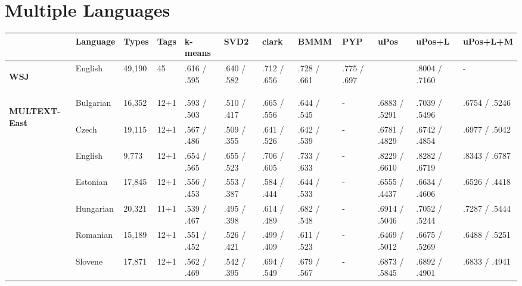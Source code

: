 \section{Multiple Languages}
\begin{landscape}
\begin{table}[ht]
  \begin{tabular}{|l|l|l|l|p{1.5cm}|p{1.5cm}|p{1.5cm}|p{1.5cm}|p{1.5cm}|p{2cm}|p{2cm}|p{2cm}|}
        \hline
        & Language   & Types   & Tags & k-means      & SVD2         & clark        & BMMM         & PYP    & uPos           & uPos+L            & uPos+L+M     \\ \hline %
        \multirow{1}{*}{\begin{sideways}\textbf{WSJ}\end{sideways}} 
        & English    & 49,190  & 45   & .616 / .595   & .640 / .582   & .712 / .656   & .728 / .661   & .775 / .697 &               & .8004 / .7160 & -           \\
        & & & & & & & & & & &\\ \hline
        \multirow{8}{*}{\begin{sideways}\textbf{MULTEXT-East}\end{sideways}} & 
        Bulgarian    & 16,352  & 12+1 & .593 / .503   & .510 / .417   & .665 / .556   & .644 / .545   & -          & .6883 / .5291  & .7039 / .5496     & .6754 / .5246 \\
        & Czech      & 19,115  & 12+1 & .567 / .486   & .509 / .355   & .641 / .526   & .642 / .539   & -          & .6781 / .4829  & .6742 / .4854     & .6977 / .5042 \\
        & English    & 9,773   & 12+1 & .654 / .565   & .655 / .523   & .706 / .605   & .733 / .633   & -          & .8229 / .6610  & .8282 / .6719     & .8343 / .6787 \\
        & Estonian   & 17,845  & 12+1 & .556 / .453   & .553 / .387   & .584 / .444   & .644 / .533   & -          & .6555 / .4437  & .6634 / .4606     & .6526 / .4418 \\
        & Hungarian  & 20,321  & 11+1 & .539 / .467   & .495 / .398   & .614 / .489   & .682 / .548   & -          & .6914 / .5046  & .7052 / .5244     & .7287 / .5444 \\
        & Romanian   & 15,189  & 12+1 & .551 / .452   & .526 / .421   & .499 / .409   & .611 / .523   & -          & .6469 / .5012  & .6675 / .5269     & .6488 / .5251 \\
        & Slovene    & 17,871  & 12+1 & .562 / .469   & .542 / .395   & .694 / .549   & .679 / .567   & -          & .6873 / .5845  & .6892 / .4901     & .6833 / .4941 \\

\end{tabular}
\end{table}
\end{landscape}
